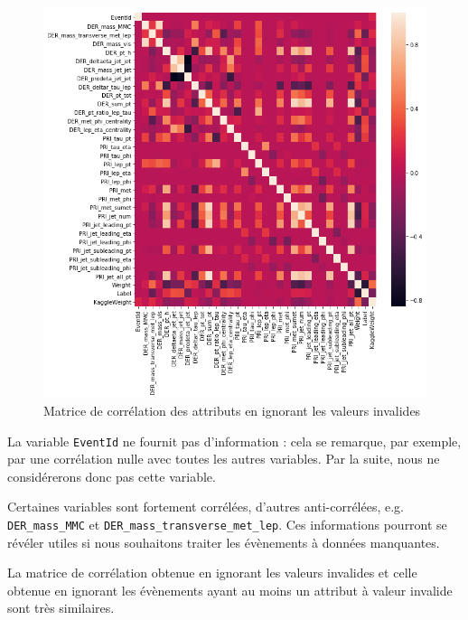 \documentclass[12pt]{article}
\begin{document}
\begin{figure}[H]
    \center
    \includegraphics[width=\textwidth]{images/heatmap.png}
    \caption{Matrice de corrélation des attributs en ignorant les valeurs invalides}
    \label{img:heatmap}
\end{figure}

La variable \texttt{EventId} ne fournit pas d'information : cela se remarque,
par exemple, par une corrélation nulle avec toutes les autres variables. Par la
suite, nous ne considérerons donc pas cette variable.


Certaines variables sont fortement corrélées, d'autres anti-corrélées, e.g.
\texttt{DER\_mass\_MMC} et \texttt{DER\_mass\_transverse\_met\_lep}. Ces
informations pourront se révéler utiles si nous souhaitons traiter les évènements à
données manquantes.

La matrice de corrélation obtenue en ignorant les valeurs invalides
et celle obtenue en ignorant les évènements ayant au moins un attribut à valeur
invalide sont très similaires.
\end{document}
